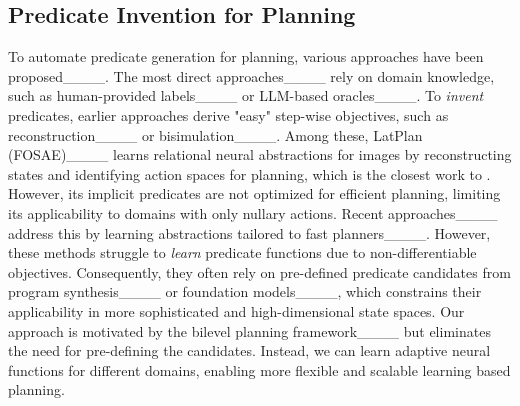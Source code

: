 \subsection{Predicate Invention for Planning}
To automate predicate generation for planning, various approaches have been proposed____. 
The most direct approaches____ rely on domain knowledge, such as human-provided labels____ or LLM-based oracles____. 
To \textit{invent} predicates, earlier approaches derive "easy" step-wise objectives, such as reconstruction____ or bisimulation____.
Among these, LatPlan (FOSAE)____ learns relational neural abstractions for images by reconstructing states and identifying action spaces for planning, which is the closest work to \model{}. 
However, its implicit predicates are not optimized for efficient planning, limiting its applicability to domains with only nullary actions. 
Recent approaches____ address this by learning abstractions tailored to fast planners____. 
However, these methods struggle to \textit{learn} predicate functions due to non-differentiable objectives. 
Consequently, they often rely on pre-defined predicate candidates from program synthesis____ or foundation models____, which constrains their applicability in more sophisticated and high-dimensional state spaces.
Our approach is motivated by the bilevel planning framework____ but eliminates the need for pre-defining the candidates. 
Instead, we can learn adaptive neural functions for different domains, enabling more flexible and scalable learning based planning.